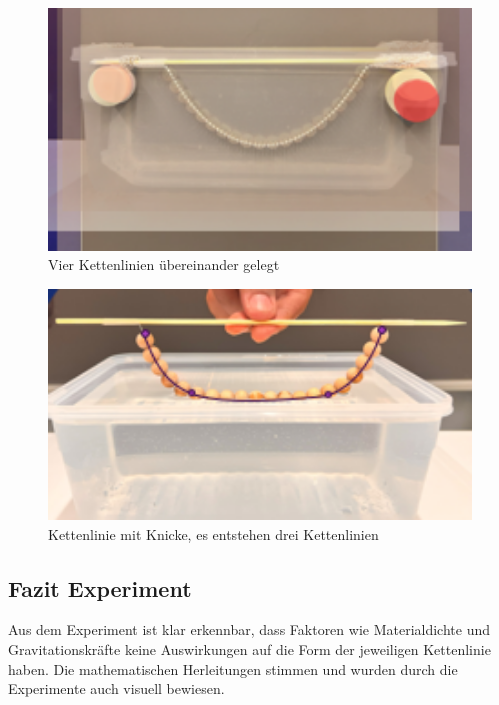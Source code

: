 \begin{figure}
	\centering
	\includegraphics[width=1\textwidth]{papers/kettenlinie/images/kettenlinie_merged.png}
	\caption{Vier Kettenlinien übereinander gelegt}
	\label{fig:Kettenlinie-Merged}
\end{figure}
\begin{figure}
	\centering
	\includegraphics[width=1\textwidth]{papers/kettenlinie/images/kettenlinie_curves.png}
	\caption{Kettenlinie mit Knicke, es entstehen drei Kettenlinien}
	\label{fig:Kettenlinie-Curves}
\end{figure}

\subsection{Fazit Experiment
\label{kettenlinie:subsection:fazit-experiment}}
Aus dem Experiment ist klar erkennbar, dass Faktoren wie Materialdichte und Gravitationskräfte keine Auswirkungen auf die Form der jeweiligen Kettenlinie haben.
Die mathematischen Herleitungen stimmen und wurden durch die Experimente auch visuell bewiesen.
